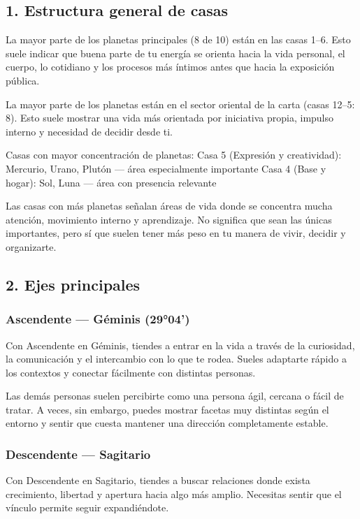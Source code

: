 \documentclass[11pt,a4paper]{article}
\begin{document}
\subsection{1. Estructura general de casas}

La mayor parte de los planetas principales (8 de 10) están en las casas 1–6. Esto suele indicar que buena parte de tu energía se orienta hacia la vida personal, el cuerpo, lo cotidiano y los procesos más íntimos antes que hacia la exposición pública.

La mayor parte de los planetas están en el sector oriental de la carta (casas 12–5: 8). Esto suele mostrar una vida más orientada por iniciativa propia, impulso interno y necesidad de decidir desde ti.

Casas con mayor concentración de planetas:
Casa 5 (Expresión y creatividad): Mercurio, Urano, Plutón — área especialmente importante
Casa 4 (Base y hogar): Sol, Luna — área con presencia relevante

Las casas con más planetas señalan áreas de vida donde se concentra mucha atención, movimiento interno y aprendizaje. No significa que sean las únicas importantes, pero sí que suelen tener más peso en tu manera de vivir, decidir y organizarte.

\vspace{0.5cm}

\subsection{2. Ejes principales}

\subsubsection*{Ascendente — Géminis (29°04')}
Con Ascendente en Géminis, tiendes a entrar en la vida a través de la curiosidad, la comunicación y el intercambio con lo que te rodea. Sueles adaptarte rápido a los contextos y conectar fácilmente con distintas personas.

Las demás personas suelen percibirte como una persona ágil, cercana o fácil de tratar. A veces, sin embargo, puedes mostrar facetas muy distintas según el entorno y sentir que cuesta mantener una dirección completamente estable.

\subsubsection*{Descendente — Sagitario}
Con Descendente en Sagitario, tiendes a buscar relaciones donde exista crecimiento, libertad y apertura hacia algo más amplio. Necesitas sentir que el vínculo permite seguir expandiéndote.
\end{document}
